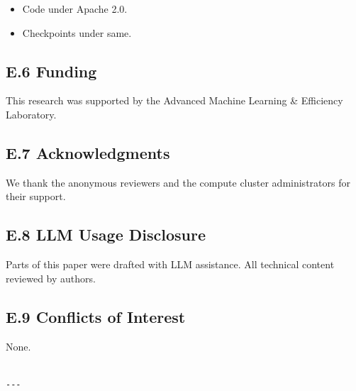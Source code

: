 \begin{itemize}
\item Code under Apache 2.0.
\item Checkpoints under same.

\end{itemize}
\subsection{E.6 Funding}

This research was supported by the Advanced Machine Learning \& Efficiency Laboratory.

\subsection{E.7 Acknowledgments}

We thank the anonymous reviewers and the compute cluster administrators for their support.

\subsection{E.8 LLM Usage Disclosure}

Parts of this paper were drafted with LLM assistance. All technical content 
reviewed by authors.

\subsection{E.9 Conflicts of Interest}

None.
\begin{lstlisting}

---
\end{lstlisting}


